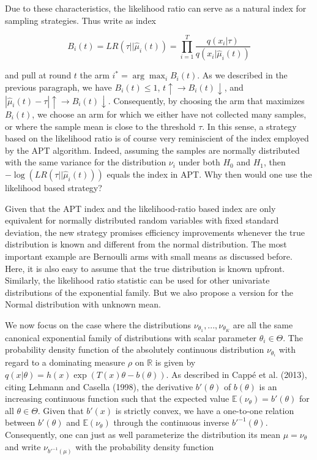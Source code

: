 \documentclass[12pt,]{article}
\begin{document}
Due to these characteristics, the likelihood ratio can serve as a
natural index for sampling strategies. Thus write as index

\[
B_i(t) = LR(\tau|| \hat{\mu}_i(t)) = \prod_{i=1}^T\frac{q(x_i|\tau)}{ q(x_i|\hat{\mu}_i(t))}
\]

and pull at round \(t\) the arm \(i^* = \arg \max_i B_i(t)\). As we
described in the previous paragraph, we have \(B_i(t) \leq 1\),
\(t \uparrow \rightarrow B_i(t) \downarrow\), and
\(|\hat{\mu}_i(t) - \tau| \uparrow \rightarrow B_i(t) \downarrow\).
Consequently, by choosing the arm that maximizes \(B_i(t)\), we choose
an arm for which we either have not collected many samples, or where the
sample mean is close to the threshold \(\tau\). In this sense, a
strategy based on the likelihood ratio is of course very reminiscient of
the index employed by the APT algorithm. Indeed, assuming the samples
are normally distributed with the same variance for the distribution
\(\nu_i\) under both \(H_0\) and \(H_1\), then
\(-\log(LR(\tau||\hat{\mu}_i(t)))\) equals the index in APT. Why then
would one use the likelihood based strategy?

Given that the APT index and the likelihood-ratio based index are only
equivalent for normally distributed random variables with fixed standard
deviation, the new strategy promises efficiency improvements whenever
the true distribution is known and different from the normal
distribution. The most important example are Bernoulli arms with small
means as discussed before. Here, it is also easy to assume that the true
distribution is known upfront. Similarly, the likelihood ratio statistic
can be used for other univariate distributions of the exponential
family. But we also propose a version for the Normal distribution with
unknown mean.

We now focus on the case where the distributions
\(\nu_{\theta_1}, ..., \nu_{\theta_K}\) are all the same canonical
exponential family of distributions with scalar parameter
\(\theta_i \in \Theta\). The probability density function of the
absolutely continuous distribution \(\nu_{\theta_i}\) with regard to a
dominating measure \(\rho\) on \(\mathbb{R}\) is given by
\(q(x|\theta) = h(x) \exp(T(x)\theta - b(\theta))\). As described in
Cappé et al. (2013), citing Lehmann and Casella (1998), the derivative
\(b'(\theta)\) of \(b(\theta)\) is an increasing continuous function
such that the expected value \(\mathbb{E}(\nu_{\theta}) = b'(\theta)\)
for all \(\theta \in \Theta\). Given that \(b'(x)\) is strictly convex,
we have a one-to-one relation between \(b'(\theta)\) and
\(\mathbb{E}(\nu_{\theta})\) through the continuous inverse
\(b'^{-1}(\theta)\). Consequently, one can just as well parameterize the
distribution its mean \(\mu = \mathbb{\nu_{\theta}}\) and write
\(\nu_{b'^{-1}(\mu)}\) with the probability density function
\end{document}
